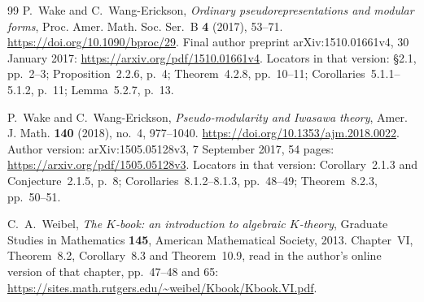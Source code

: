 \documentclass[11pt]{article}
\theoremstyle{definition}
\numberwithin{equation}{section}
\begin{document}
\begin{thebibliography}{99}
P.~Wake and C.~Wang-Erickson,
\emph{Ordinary pseudorepresentations and modular forms},
Proc. Amer. Math. Soc. Ser.~B \textbf{4} (2017), 53--71.
\url{https://doi.org/10.1090/bproc/29}.
Final author preprint arXiv:1510.01661v4, 30 January 2017:
\url{https://arxiv.org/pdf/1510.01661v4}.
Locators in that version: \S2.1, pp.~2--3;
Proposition~2.2.6, p.~4; Theorem~4.2.8, pp.~10--11;
Corollaries~5.1.1--5.1.2, p.~11; Lemma~5.2.7, p.~13.

P.~Wake and C.~Wang-Erickson,
\emph{Pseudo-modularity and Iwasawa theory},
Amer. J. Math. \textbf{140} (2018), no.~4, 977--1040.
\url{https://doi.org/10.1353/ajm.2018.0022}.
Author version: arXiv:1505.05128v3,
7 September 2017, 54 pages:
\url{https://arxiv.org/pdf/1505.05128v3}.
Locators in that version: Corollary~2.1.3 and Conjecture~2.1.5, p.~8;
Corollaries~8.1.2--8.1.3, pp.~48--49;
Theorem~8.2.3, pp.~50--51.

C.~A.~Weibel, \emph{The $K$-book: an introduction to algebraic $K$-theory},
Graduate Studies in Mathematics \textbf{145}, American Mathematical Society, 2013.
Chapter~VI, Theorem~8.2, Corollary~8.3 and Theorem~10.9, read in the author's online version of that chapter,
pp.~47--48 and 65: \url{https://sites.math.rutgers.edu/~weibel/Kbook/Kbook.VI.pdf}.
\end{thebibliography}
\endgroup
\end{document}
